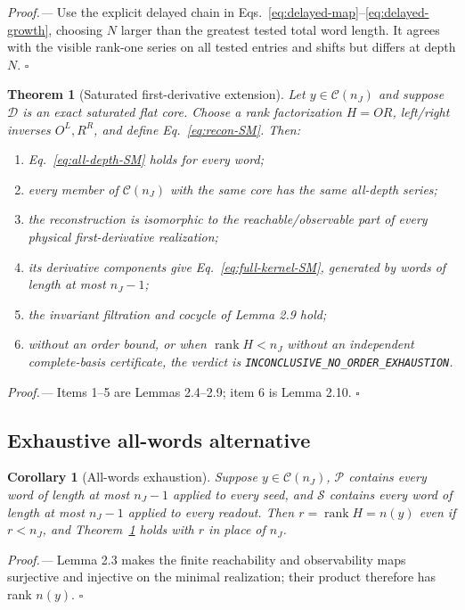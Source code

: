 \documentclass[aps,prl,onecolumn,superscriptaddress,nofootinbib]{revtex4-2}
\newcommand{\rank}{\operatorname{rank}}
\newcommand{\cP}{\mathcal P}
\newcommand{\cS}{\mathcal S}
\newcommand{\cC}{\mathcal C}
\newcommand{\cD}{\mathcal D}
\newtheorem{theorem}{Theorem}
\newtheorem{corollary}{Corollary}
\begin{document}
\emph{Proof.---}
Use the explicit delayed chain in Eqs.~\eqref{eq:delayed-map}--\eqref{eq:delayed-growth}, choosing $N$ larger than the greatest tested total word length.  It agrees with the visible rank-one series on all tested entries and shifts but differs at depth $N$. \hfill$\square$

\begin{theorem}[Saturated first-derivative extension]
\label{thm:flat-extension}
Let $y\in\cC(n_J)$ and suppose $\cD$ is an exact saturated flat core.  Choose a rank factorization $H=OR$, left/right inverses $O^L,R^R$, and define Eq.~\eqref{eq:recon-SM}.  Then:
\begin{enumerate}
\item Eq.~\eqref{eq:all-depth-SM} holds for every word;
\item every member of $\cC(n_J)$ with the same core has the same all-depth series;
\item the reconstruction is isomorphic to the reachable/observable part of every physical first-derivative realization;
\item its derivative components give Eq.~\eqref{eq:full-kernel-SM}, generated by words of length at most $n_J-1$;
\item the invariant filtration and cocycle of Lemma 2.9 hold;
\item without an order bound, or when $\rank H<n_J$ without an independent complete-basis certificate, the verdict is \texttt{INCONCLUSIVE\_NO\_ORDER\_EXHAUSTION}.
\end{enumerate}
\end{theorem}

\emph{Proof.---}
Items 1--5 are Lemmas 2.4--2.9; item 6 is Lemma 2.10. \hfill$\square$

\subsection{Exhaustive all-words alternative}

\begin{corollary}[All-words exhaustion]
\label{cor:exhaustive}
Suppose $y\in\cC(n_J)$, $\cP$ contains every word of length at most $n_J-1$ applied to every seed, and $\cS$ contains every word of length at most $n_J-1$ applied to every readout.  Then $r=\rank H=n(y)$ even if $r<n_J$, and Theorem~\ref{thm:flat-extension} holds with $r$ in place of $n_J$.
\end{corollary}

\emph{Proof.---}
Lemma 2.3 makes the finite reachability and observability maps surjective and injective on the minimal realization; their product therefore has rank $n(y)$. \hfill$\square$
\end{document}
